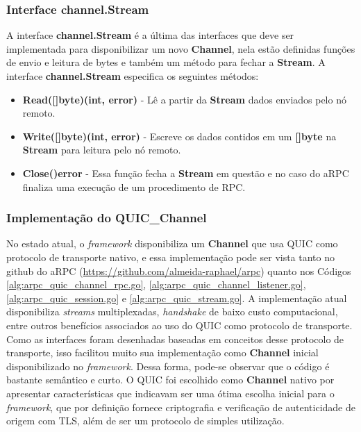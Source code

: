 \subsubsection{Interface channel.Stream}

A interface \textbf{channel.Stream} é a última das interfaces que deve ser implementada para disponibilizar um novo \textbf{Channel}, nela estão definidas funções de envio e leitura de bytes e também um método para fechar a \textbf{Stream}. A interface \textbf{channel.Stream} especifica os seguintes métodos:

\begin{itemize}
	\item \textbf{Read([]byte)(int, error)} - Lê a partir da \textbf{Stream} dados enviados pelo nó remoto.
	\item \textbf{Write([]byte)(int, error)} - Escreve os dados contidos em um \textbf{[]byte} na \textbf{Stream} para leitura pelo nó remoto.
	\item \textbf{Close()error} - Essa função fecha a \textbf{Stream} em questão e no caso do aRPC finaliza uma execução de um procedimento de RPC.
\end{itemize}

\subsubsection{Implementação do \textbf{QUIC\_Channel}}

No estado atual, o \textit{framework} disponibiliza um \textbf{Channel} que usa QUIC como protocolo de transporte nativo, e essa implementação pode ser vista tanto no github do aRPC (\url{https://github.com/almeida-raphael/arpc}) quanto nos Códigos \ref{alg:arpc_quic_channel_rpc.go}, \ref{alg:arpc_quic_channel_listener.go}, \ref{alg:arpc_quic_session.go} e  \ref{alg:arpc_quic_stream.go}. A implementação atual disponibiliza \textit{streams} multiplexadas, \textit{handshake} de baixo custo computacional, entre outros benefícios associados ao uso do QUIC como protocolo de transporte. Como as interfaces foram desenhadas baseadas em conceitos desse protocolo de transporte, isso facilitou muito sua implementação como \textbf{Channel} inicial disponibilizado no \textit{framework}. Dessa forma, pode-se observar que o código é bastante semântico e curto. O QUIC foi escolhido como \textbf{Channel} nativo por apresentar características que indicavam ser uma ótima escolha inicial para o \textit{framework}, que por definição fornece criptografia e verificação de autenticidade de origem com TLS, além de ser um protocolo de simples utilização.

